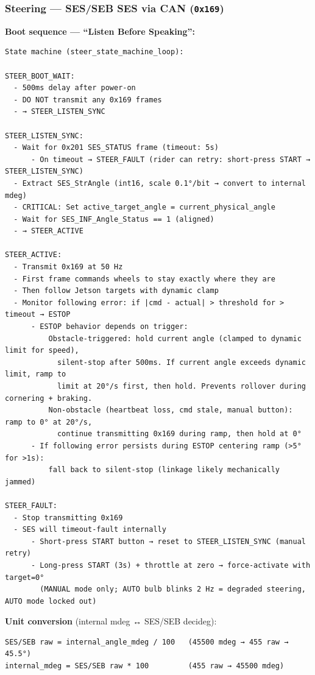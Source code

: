 \documentclass[12pt,a4paper,oneside]{report}
\begin{document}
\subsubsection{\texorpdfstring{Steering --- SES/SEB SES via CAN
(\texttt{0x169})}{Steering --- SES/SEB SES via CAN (0x169)}}\label{steering-SES/SEB-SES-via-can-0x169}

\textbf{Boot sequence --- ``Listen Before Speaking'':}

\begin{verbatim}
State machine (steer_state_machine_loop):

STEER_BOOT_WAIT:
  - 500ms delay after power-on
  - DO NOT transmit any 0x169 frames
  - → STEER_LISTEN_SYNC

STEER_LISTEN_SYNC:
  - Wait for 0x201 SES_STATUS frame (timeout: 5s)
      - On timeout → STEER_FAULT (rider can retry: short-press START → STEER_LISTEN_SYNC)
  - Extract SES_StrAngle (int16, scale 0.1°/bit → convert to internal mdeg)
  - CRITICAL: Set active_target_angle = current_physical_angle
  - Wait for SES_INF_Angle_Status == 1 (aligned)
  - → STEER_ACTIVE

STEER_ACTIVE:
  - Transmit 0x169 at 50 Hz
  - First frame commands wheels to stay exactly where they are
  - Then follow Jetson targets with dynamic clamp
  - Monitor following error: if |cmd - actual| > threshold for > timeout → ESTOP
      - ESTOP behavior depends on trigger:
          Obstacle-triggered: hold current angle (clamped to dynamic limit for speed),
            silent-stop after 500ms. If current angle exceeds dynamic limit, ramp to
            limit at 20°/s first, then hold. Prevents rollover during cornering + braking.
          Non-obstacle (heartbeat loss, cmd stale, manual button): ramp to 0° at 20°/s,
            continue transmitting 0x169 during ramp, then hold at 0°
      - If following error persists during ESTOP centering ramp (>5° for >1s):
          fall back to silent-stop (linkage likely mechanically jammed)

STEER_FAULT:
  - Stop transmitting 0x169
  - SES will timeout-fault internally
      - Short-press START button → reset to STEER_LISTEN_SYNC (manual retry)
      - Long-press START (3s) + throttle at zero → force-activate with target=0°
        (MANUAL mode only; AUTO bulb blinks 2 Hz = degraded steering, AUTO mode locked out)
\end{verbatim}

\textbf{Unit conversion} (internal mdeg ↔ SES/SEB decideg):

\begin{verbatim}
SES/SEB raw = internal_angle_mdeg / 100   (45500 mdeg → 455 raw → 45.5°)
internal_mdeg = SES/SEB raw * 100         (455 raw → 45500 mdeg)
\end{verbatim}
\end{document}
